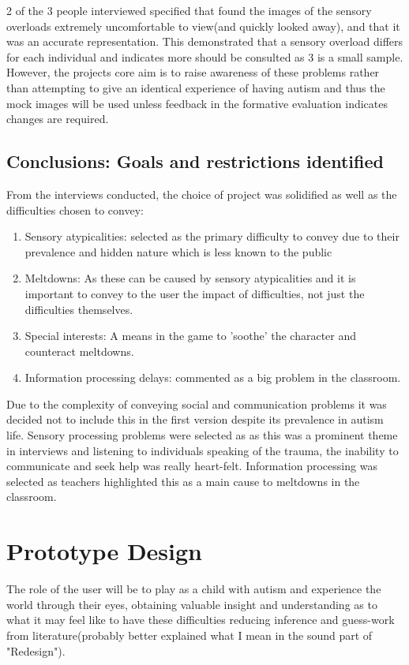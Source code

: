 \documentclass[11pt]{report}
\begin{document}
2 of the 3 people interviewed specified that found the images of the sensory overloads extremely uncomfortable to view(and quickly looked away), and that it was an accurate representation. This demonstrated that a sensory overload differs for each individual and indicates more should be consulted as 3 is a small sample. However, the projects core aim is to raise awareness of these problems rather than attempting to give an identical experience of having autism and thus the mock images will be used unless feedback in the formative evaluation indicates changes are required. 


\section{Conclusions: Goals and restrictions identified}

From the interviews conducted, the choice of project was solidified as well as the difficulties chosen to convey:

\begin{enumerate}
\item Sensory atypicalities: selected as the primary difficulty to convey due to their prevalence and hidden nature which is less known to the public
\item Meltdowns: As these can be caused by sensory atypicalities and it is important to convey to the user the impact of difficulties, not just the difficulties themselves.
\item Special interests: A means in the game to 'soothe' the character and counteract meltdowns.
\item Information processing delays: commented as a big problem in the classroom.
\end{enumerate}

Due to the complexity of conveying social and communication problems it was decided not to include this in the first version despite its prevalence in autism life. Sensory processing problems were selected as as this was a prominent theme in interviews and listening to individuals speaking of the trauma, the inability to communicate and seek help was really heart-felt. Information processing was selected as teachers highlighted this as a main cause to meltdowns in the classroom. 


\chapter{Prototype Design}
The role of the user will be to play as a child with autism and experience the world through their eyes, obtaining valuable insight and understanding as to what it may feel like to have these difficulties reducing inference and guess-work from literature(probably better explained what I mean in the sound part of "Redesign").
\end{document}
